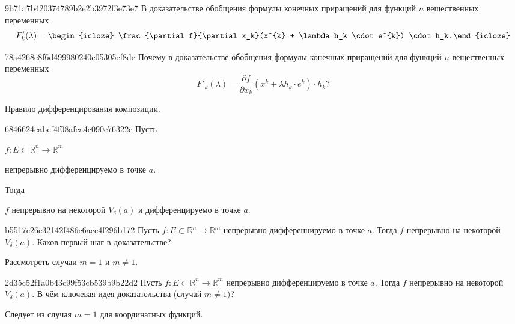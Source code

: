 \begin{note}{9b71a7b420374789b2e2b3972f3e73e7}
    В доказательстве обобщения формулы конечных приращений для функций \({ n }\) вещественных переменных
    \[
        F'_k(\lambda) = \begin{icloze}{1}\frac{\partial f}{\partial x_k}(x^{k} + \lambda h_k \cdot e^{k}) \cdot h_k.\end{icloze}
    \]
\end{note}

\begin{note}{78a4268e8f6d499980240c05305ef8de}
    Почему в доказательстве обобщения формулы конечных приращений для функций \({ n }\) вещественных переменных
    \[
        F'_k(\lambda) = \frac{\partial f}{\partial x_k}(x^{k} + \lambda h_k \cdot e^{k}) \cdot h_k?
    \]

    \begin{cloze}{1}
        Правило дифференцирования композиции.
    \end{cloze}
\end{note}

\begin{note}{6846624cabef4f08afca4c090e76322e}
    Пусть \begin{icloze}{3}\({ f : E \subset \mathbb R^{n} \to \mathbb R^{m} }\)\end{icloze} \begin{icloze}{2}непрерывно дифференцируемо в точке \({ a }\).\end{icloze}
    Тогда \begin{icloze}{1}\({ f }\) непрерывно на некоторой \({ V_{\delta}(a) }\) и дифференцируемо в точке \({ a }\).\end{icloze}
\end{note}

\begin{note}{b5517c26c32142f486c6acc4f296b172}
    Пусть \({ f : E \subset \mathbb R^{n} \to \mathbb R^{m} }\) непрерывно дифференцируемо в точке \({ a }\).
    Тогда \({ f }\) непрерывно на некоторой \({ V_{\delta}(a) }\).
    Каков первый шаг в доказательстве?

    \begin{cloze}{1}
        Рассмотреть случаи \({ m = 1 }\) и \({ m \neq 1 }\).
    \end{cloze}
\end{note}

\begin{note}{2d35c52f1a0b43c99f53cb539b9b22d2}
    Пусть \({ f : E \subset \mathbb R^{n} \to \mathbb R^{m} }\) непрерывно дифференцируемо в точке \({ a }\).
    Тогда \({ f }\) непрерывно на некоторой \({ V_{\delta}(a) }\).
    В чём ключевая идея доказательства (случай \({ m \neq 1 }\))?

    \begin{cloze}{1}
        Следует из случая \({ m = 1 }\) для координатных функций.
    \end{cloze}
\end{note}

